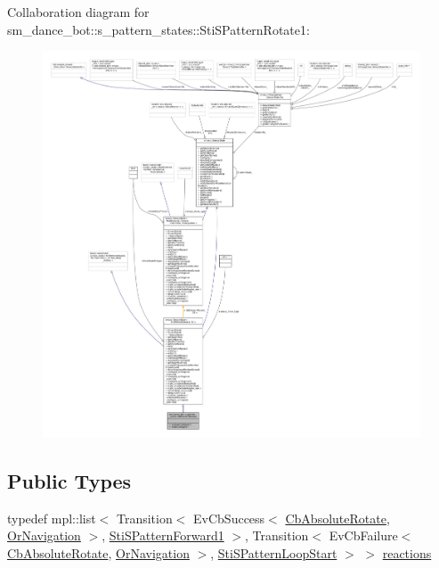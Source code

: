 Collaboration diagram for sm\+\_\+dance\+\_\+bot\+:\+:s\+\_\+pattern\+\_\+states\+:\+:Sti\+S\+Pattern\+Rotate1\+:
\nopagebreak
\begin{figure}[H]
\begin{center}
\leavevmode
\includegraphics[width=350pt]{structsm__dance__bot_1_1s__pattern__states_1_1StiSPatternRotate1__coll__graph}
\end{center}
\end{figure}
\subsection*{Public Types}
\begin{DoxyCompactItemize}
\item 
typedef mpl\+::list$<$ Transition$<$ Ev\+Cb\+Success$<$ \hyperlink{classcl__move__base__z_1_1CbAbsoluteRotate}{Cb\+Absolute\+Rotate}, \hyperlink{classsm__dance__bot_1_1OrNavigation}{Or\+Navigation} $>$, \hyperlink{structsm__dance__bot_1_1s__pattern__states_1_1StiSPatternForward1}{Sti\+S\+Pattern\+Forward1} $>$, Transition$<$ Ev\+Cb\+Failure$<$ \hyperlink{classcl__move__base__z_1_1CbAbsoluteRotate}{Cb\+Absolute\+Rotate}, \hyperlink{classsm__dance__bot_1_1OrNavigation}{Or\+Navigation} $>$, \hyperlink{structsm__dance__bot_1_1s__pattern__states_1_1StiSPatternLoopStart}{Sti\+S\+Pattern\+Loop\+Start} $>$ $>$ \hyperlink{structsm__dance__bot_1_1s__pattern__states_1_1StiSPatternRotate1_a468a9b3e22c8a98b3bdf0f03dd1687e7}{reactions}
\end{DoxyCompactItemize}
